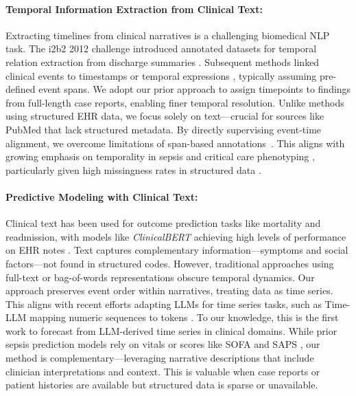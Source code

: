 \documentclass[letterpaper]{article} %
\begin{document}
\paragraph{Temporal Information Extraction from Clinical Text:}
Extracting timelines from clinical narratives is a challenging biomedical NLP task. The i2b2 2012 challenge introduced annotated datasets for temporal relation extraction from discharge summaries \citep{uzuner20112010}. Subsequent methods linked clinical events to timestamps or temporal expressions \citep{leeuwenberg2020towards, frattallone2024using}, typically assuming pre-defined event spans. We adopt our prior approach \citep{noroozizadeh2025reconstructing, noroozizadeh2025pmoa} to assign timepoints to findings from full-length case reports, enabling finer temporal resolution. Unlike methods using structured EHR data, we focus solely on text—crucial for sources like PubMed that lack structured metadata. By directly supervising event-time alignment, we overcome limitations of span-based annotations~\citep{rosenbloom2011data}. This aligns with growing emphasis on temporality in sepsis and critical care phenotyping \citep{johnson2018comparative, kamran2024evaluation}, particularly given high missingness rates in structured data \citep{johnson2023mimic,seinen2025using}.

\paragraph{Predictive Modeling with Clinical Text:}
Clinical text has been used for outcome prediction tasks like mortality and readmission, with models like \textit{ClinicalBERT} achieving high levels of performance on EHR notes \citep{huang2019clinicalbert, gu2021domain}. 
Text captures complementary information—symptoms and social factors—not found in structured codes. 
However, traditional approaches using full-text or bag-of-words representations obscure temporal dynamics. 
Our approach preserves event order within narratives, treating data as time series. This aligns with recent efforts adapting LLMs for time series tasks, such as Time-LLM mapping numeric sequences to tokens \citep{jin2023time}. 
To our knowledge, this is the first work to forecast from LLM-derived time series in clinical domains. 
While prior sepsis prediction models rely on vitals or scores like SOFA and SAPS \citep{hou2020predicting, noroozizadeh2023temporal}, our method is complementary—leveraging narrative descriptions that include clinician interpretations and context. 
This is valuable when case reports or patient histories are available but structured data is sparse or unavailable.
\end{document}
